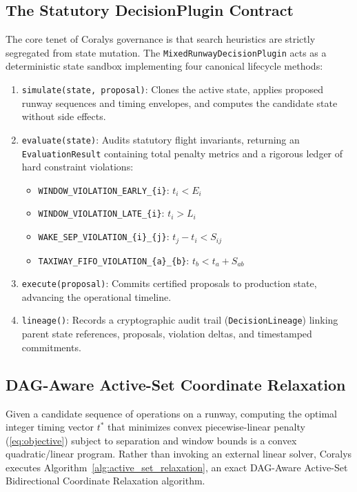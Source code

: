 \documentclass[10pt,journal,compsoc]{IEEEtran}
\begin{document}
\subsection{The Statutory DecisionPlugin Contract}
The core tenet of Coralys governance is that search heuristics are strictly segregated from state mutation. The \texttt{MixedRunwayDecisionPlugin} acts as a deterministic state sandbox implementing four canonical lifecycle methods:
\begin{enumerate}
    \item \texttt{simulate(state, proposal)}: Clones the active state, applies proposed runway sequences and timing envelopes, and computes the candidate state without side effects.
    \item \texttt{evaluate(state)}: Audits statutory flight invariants, returning an \texttt{EvaluationResult} containing total penalty metrics and a rigorous ledger of hard constraint violations:
    \begin{itemize}
        \item \texttt{WINDOW\_VIOLATION\_EARLY\_\{i\}}: $t_i < E_i$
        \item \texttt{WINDOW\_VIOLATION\_LATE\_\{i\}}: $t_i > L_i$
        \item \texttt{WAKE\_SEP\_VIOLATION\_\{i\}\_\{j\}}: $t_j - t_i < S_{ij}$
        \item \texttt{TAXIWAY\_FIFO\_VIOLATION\_\{a\}\_\{b\}}: $t_b < t_a + S_{ab}$
    \end{itemize}
    \item \texttt{execute(proposal)}: Commits certified proposals to production state, advancing the operational timeline.
    \item \texttt{lineage()}: Records a cryptographic audit trail (\texttt{DecisionLineage}) linking parent state references, proposals, violation deltas, and timestamped commitments.
\end{enumerate}

\subsection{DAG-Aware Active-Set Coordinate Relaxation}
Given a candidate sequence of operations on a runway, computing the optimal integer timing vector $t^*$ that minimizes convex piecewise-linear penalty (\ref{eq:objective}) subject to separation and window bounds is a convex quadratic/linear program. Rather than invoking an external linear solver, Coralys executes Algorithm~\ref{alg:active_set_relaxation}, an exact DAG-Aware Active-Set Bidirectional Coordinate Relaxation algorithm.
\end{document}
